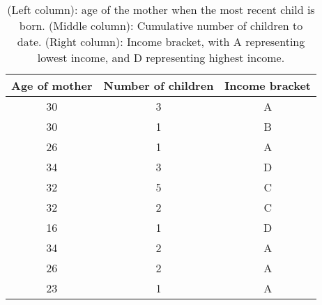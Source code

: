 \documentclass{article}
\begin{document}
\begin{table}
\small
\centering
\begin{tabular}{c | c | c }
Age of mother & Number of children & Income bracket \\ \hline
30 & 3 & A \\ \hline
30 & 1 & B \\ \hline
26 & 1 & A \\ \hline
34 & 3 & D \\ \hline
32 & 5 & C \\ \hline
32 & 2 & C \\ \hline
16 & 1 & D \\ \hline
34 & 2 & A \\ \hline
26 & 2 & A \\ \hline
23 & 1 & A \\ \hline
\end{tabular}
\caption{\label{tab:1} (Left column): age of the mother when the most recent child is born. (Middle column): Cumulative number of children to date. (Right column): Income bracket, with A representing lowest income, and D representing highest income.}
\end{table}
\end{document}

